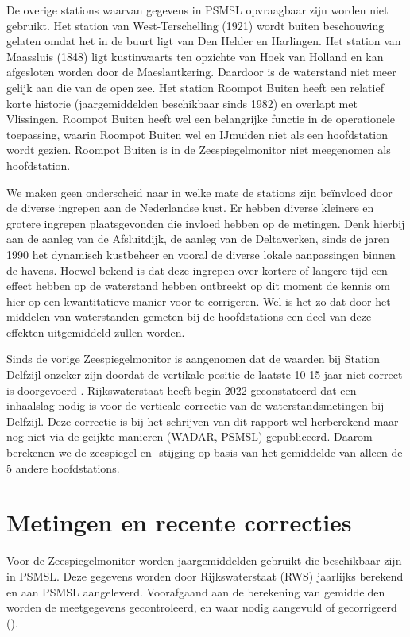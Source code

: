 \documentclass[ddraft]{deltares_report}
\begin{document}
De overige stations waarvan gegevens in PSMSL opvraagbaar zijn worden
niet gebruikt. Het station van West-Terschelling (1921) wordt buiten
beschouwing gelaten omdat het in de buurt ligt van Den Helder en
Harlingen. Het station van Maassluis (1848) ligt kustinwaarts ten
opzichte van Hoek van Holland en kan afgesloten worden door de
Maeslantkering. Daardoor is de waterstand niet meer gelijk aan die van
de open zee. Het station Roompot Buiten heeft een relatief korte
historie (jaargemiddelden beschikbaar sinds 1982) en overlapt met
Vlissingen. Roompot Buiten heeft wel een belangrijke functie in de
operationele toepassing, waarin Roompot Buiten wel en IJmuiden niet als
een hoofdstation wordt gezien. Roompot Buiten is in de Zeespiegelmonitor
niet meegenomen als hoofdstation.

We maken geen onderscheid naar in welke mate de stations zijn beïnvloed
door de diverse ingrepen aan de Nederlandse kust. Er hebben diverse
kleinere en grotere ingrepen plaatsgevonden die invloed hebben op de
metingen. Denk hierbij aan de aanleg van de Afsluitdijk, de aanleg van
de Deltawerken, sinds de jaren 1990 het dynamisch kustbeheer en vooral
de diverse lokale aanpassingen binnen de havens. Hoewel bekend is dat
deze ingrepen over kortere of langere tijd een effect hebben op de
waterstand \citep{Becker2009} hebben ontbreekt op dit moment de kennis
om hier op een kwantitatieve manier voor te corrigeren. Wel is het zo
dat door het middelen van waterstanden gemeten bij de hoofdstations een
deel van deze effekten uitgemiddeld zullen worden.

Sinds de vorige Zeespiegelmonitor is aangenomen dat de waarden bij
Station Delfzijl onzeker zijn doordat de vertikale positie de laatste
10-15 jaar niet correct is doorgevoerd \citep{Honingh2021}.
Rijkswaterstaat heeft begin 2022 geconstateerd dat een inhaalslag nodig
is voor de verticale correctie van de waterstandsmetingen bij Delfzijl.
Deze correctie is bij het schrijven van dit rapport wel herberekend maar
nog niet via de geijkte manieren (WADAR, PSMSL) gepubliceerd. Daarom
berekenen we de zeespiegel en -stijging op basis van het gemiddelde van
alleen de 5 andere hoofdstations.

\section{Metingen en recente
correcties}\label{sec-metingen-en-recente-correcties}

Voor de Zeespiegelmonitor worden jaargemiddelden gebruikt die
beschikbaar zijn in PSMSL. Deze gegevens worden door
Rijkswaterstaat (RWS) jaarlijks berekend en aan PSMSL aangeleverd.
Voorafgaand aan de berekening van gemiddelden worden de meetgegevens
gecontroleerd, en waar nodig aangevuld of gecorrigeerd
(\citet{Honingh2021}).
\end{document}
